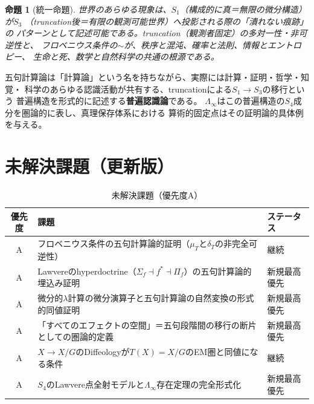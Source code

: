 \documentclass[11pt,a4paper]{ltjsarticle}
\newtheorem{proposition}[definition]{命題}
\theoremstyle{remark}
\newcommand{\LawvereInfinity}{\Lambda_\infty}
\begin{document}
\begin{proposition}[統一命題]
世界のあらゆる現象は、$S_1$（構成的に真＝無限の微分構造）が$S_3$
（truncation後＝有限の観測可能世界）へ投影される際の「潰れない痕跡」の
パターンとして記述可能である。truncation（観測者固定）の多対一性・非可逆性と、
フロベニウス条件の$\sim$が、秩序と混沌、確率と法則、情報とエントロピー、
生命と死、数学と自然科学の共通の根源である。
\end{proposition}

五句計算論は「計算論」という名を持ちながら、実際には計算・証明・哲学・知覚・
科学のあらゆる認識活動が共有する、truncationによる$S_1\to S_3$の移行という
普遍構造を形式的に記述する\textbf{普遍認識論}である。
$\LawvereInfinity$はこの普遍構造の$S_4$成分を圏論的に表し、真理保存体系における
算術的固定点はその証明論的具体例を与える\cite{ChibaLambda2026}。

\section{未解決課題（更新版）}

\begin{table}[htbp]
\centering
\caption{未解決課題（優先度A）}
\label{tab:open-problems-perspective}
\small
\begin{tabularx}{\textwidth}{@{}c >{\raggedright\arraybackslash}X >{\raggedright\arraybackslash}p{}@{}}
\toprule
優先度 & 課題 & ステータス \\
\midrule
A & フロベニウス条件の五句計算論的証明（$\mu_T$と$\delta_T$の非完全可逆性） & 継続 \\
A & Lawvereのhyperdoctrine（$\Sigma_f\dashv f^*\dashv\Pi_f$）の五句計算論的埋込み証明 & 新規最高優先 \\
A & 微分的$\lambda$計算の微分演算子と五句計算論の自然変換の形式的同値証明 & 新規最高優先 \\
A & 「すべてのエフェクトの空間」＝五句段階間の移行の断片としての圏論的定義 & 新規最高優先 \\
A & $X\to X/G$のDiffeologyが$T(X)=X/G$のEM圏と同値になる条件 & 継続 \\
A & $S_4$のLawvere点全射モデルと$\LawvereInfinity$存在定理の完全形式化 & 新規最高優先 \\
\bottomrule
\end{tabularx}
\end{table}
\end{document}
